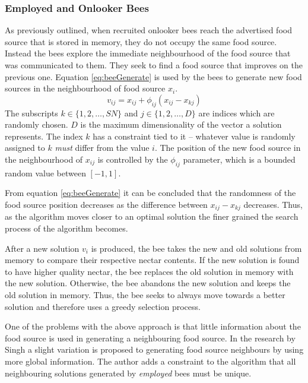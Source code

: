 \subsubsection{Employed and Onlooker Bees}
\label{sec:employonlookerbees}
As previously outlined, when recruited onlooker bees reach the advertised food source that is stored in memory, they do not occupy the same food source\cite{ABCCompareStudy,ABCNumericalOptimization}. Instead the bees explore the immediate neighbourhood of the food source that was communicated to them\cite{BeeJobShop,ABCFusionGrid,ABCReconfigDistro}. They seek to find a food source that improves on the previous one\cite{BeeJobShop,ABCNumericalOptimization}. Equation \ref{eq:beeGenerate} is used by the bees to generate new food sources in the neighbourhood of food source $x_i$\cite{ABCCompareStudy,ABCFusionGrid}.
\begin{equation}
\label{eq:beeGenerate}
v_{ij} = x_{ij} + \phi_{ij}(x_{ij} - x_{kj})
\end{equation}
The subscripts $k \in \{1,2,\dots,SN\}$ and $j \in \{1,2,\dots,D\}$ are indices which are randomly chosen. $D$ is the maximum dimensionality of the vector a solution represents. The index $k$ has a constraint tied to it -- whatever value is randomly assigned to $k$ \emph{must} differ from the value $i$. The position of the new food source in the neighbourhood of $x_{ij}$ is controlled by the $\phi_{ij}$ parameter, which is a bounded random value between $[-1,1]$. 

From equation \ref{eq:beeGenerate} it can be concluded that the randomness of the food source position decreases as the difference between $x_{ij} - x_{kj}$ decreases. Thus, as the algorithm moves closer to an optimal solution the finer grained the search process of the algorithm becomes\cite{ABCCompareStudy,ABCNumericalOptimization,ABCImageEnhancement}.

After a new solution $v_i$ is produced, the bee takes the new and old solutions from memory to compare their respective nectar contents. If the new solution is found to have higher quality nectar, the bee replaces the old solution in memory with the new solution\cite{ABCCompareStudy,ABCReconfigDistro}. Otherwise, the bee abandons the new solution and keeps the old solution in memory\cite{ABCCompareStudy,ABCNumericalOptimization}. Thus, the bee seeks to always move towards a better solution and therefore uses a greedy selection process\cite{ABCLeafConstrained,ABCReconfigDistro}.

One of the problems with the above approach is that little information about the food source is used in generating a neighbouring food source. In the research by Singh \cite{ABCLeafConstrained} a slight variation is proposed to generating food source neighbours by using more global information. The author adds a constraint to the algorithm that all neighbouring solutions generated by \emph{employed} bees must be unique. 

